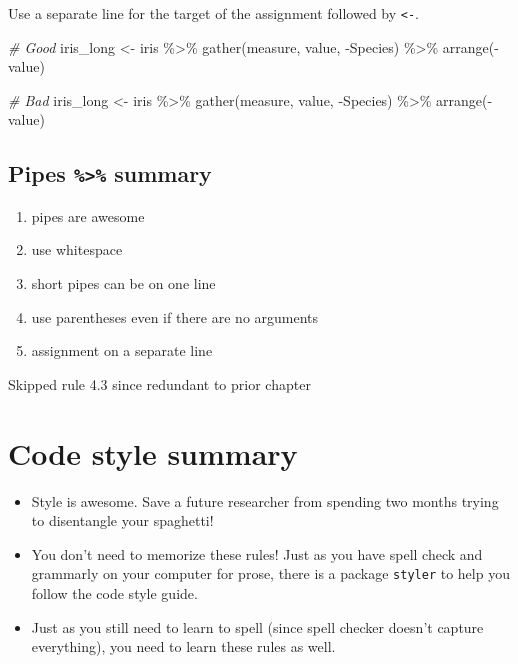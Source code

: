 \documentclass[
  letterpaper,
  DIV=11,
  numbers=noendperiod]{scrreprt}
\newenvironment{Shaded}{\begin{snugshade}}{\end{snugshade}}
\newcommand{\CommentTok}[1]{\textcolor[rgb]{0.38,0.63,0.69}{\textit{#1}}}
\newcommand{\FunctionTok}[1]{\textcolor[rgb]{0.02,0.16,0.49}{#1}}
\newcommand{\NormalTok}[1]{\textcolor[rgb]{0.00,0.44,0.13}{#1}}
\newcommand{\OtherTok}[1]{\textcolor[rgb]{0.00,0.44,0.13}{#1}}
\newcommand{\SpecialCharTok}[1]{\textcolor[rgb]{0.25,0.44,0.63}{#1}}
\providecommand{\tightlist}{%
  \setlength{\itemsep}{0pt}\setlength{\parskip}{0pt}}\usepackage{longtable,booktabs,array}
\begin{document}
Use a separate line for the target of the assignment followed by
\texttt{\textless{}-}.

\begin{Shaded}
\begin{Highlighting}[]
\CommentTok{\# Good}
\NormalTok{iris\_long }\OtherTok{\textless{}{-}}
\NormalTok{  iris }\SpecialCharTok{\%\textgreater{}\%}
  \FunctionTok{gather}\NormalTok{(measure, value, }\SpecialCharTok{{-}}\NormalTok{Species) }\SpecialCharTok{\%\textgreater{}\%}
  \FunctionTok{arrange}\NormalTok{(}\SpecialCharTok{{-}}\NormalTok{value)}

\CommentTok{\# Bad}
\NormalTok{iris\_long }\OtherTok{\textless{}{-}}\NormalTok{ iris }\SpecialCharTok{\%\textgreater{}\%}
  \FunctionTok{gather}\NormalTok{(measure, value, }\SpecialCharTok{{-}}\NormalTok{Species) }\SpecialCharTok{\%\textgreater{}\%}
  \FunctionTok{arrange}\NormalTok{(}\SpecialCharTok{{-}}\NormalTok{value)}
\end{Highlighting}
\end{Shaded}

\hypertarget{pipes-summary}{%
\subsection{\texorpdfstring{Pipes \texttt{\%\textgreater{}\%}
summary}{Pipes \%\textgreater\% summary}}\label{pipes-summary}}

\begin{enumerate}
\def\labelenumi{\arabic{enumi}.}
\tightlist
\item
  pipes are awesome
\item
  use whitespace
\item
  short pipes can be on one line
\item
  use parentheses even if there are no arguments
\item
  assignment on a separate line
\end{enumerate}

Skipped rule 4.3 since redundant to prior chapter

\hypertarget{code-style-summary}{%
\section{Code style summary}\label{code-style-summary}}

\begin{itemize}
\tightlist
\item
  Style is awesome. Save a future researcher from spending two months
  trying to disentangle your spaghetti!
\item
  You don't need to memorize these rules! Just as you have spell check
  and grammarly on your computer for prose, there is a package
  \texttt{styler} to help you follow the code style guide.
\item
  Just as you still need to learn to spell (since spell checker doesn't
  capture everything), you need to learn these rules as well.
\end{itemize}
\end{document}
